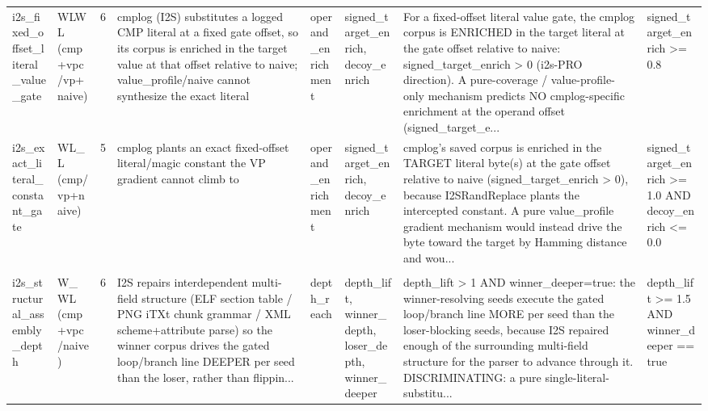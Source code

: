 \documentclass[7pt]{extarticle}
\begin{document}
{\begin{longtable}{@{}p{2.4cm}p{1.9cm}rp{4.3cm}p{1.5cm}p{1.7cm}p{4.6cm}p{3.0cm}@{}}
i2s\_\allowbreak fixed\_\allowbreak offset\_\allowbreak literal\_\allowbreak value\_\allowbreak gate & WLWL (cmp+vpc/vp+naive) & 6 & cmplog (I2S) substitutes a logged CMP literal at a fixed gate offset, so its corpus is enriched in the target value at that offset relative to naive; value\_\allowbreak profile/naive cannot synthesize the exact literal & operand\_\allowbreak enrichment & signed\_\allowbreak target\_\allowbreak enrich, decoy\_\allowbreak enrich & For a fixed-offset literal value gate, the cmplog corpus is ENRICHED in the target literal at the gate offset relative to naive: signed\_\allowbreak target\_\allowbreak enrich \textgreater{} 0 (i2s-PRO direction). A pure-coverage / value-profile-only mechanism predicts NO cmplog-specific enrichment at the operand offset (signed\_\allowbreak target\_\allowbreak e... & signed\_\allowbreak target\_\allowbreak enrich \textgreater{}= 0.8\\
i2s\_\allowbreak exact\_\allowbreak literal\_\allowbreak constant\_\allowbreak gate & WL\_\allowbreak L (cmp/vp+naive) & 5 & cmplog plants an exact fixed-offset literal/magic constant the VP gradient cannot climb to & operand\_\allowbreak enrichment & signed\_\allowbreak target\_\allowbreak enrich, decoy\_\allowbreak enrich & cmplog's saved corpus is enriched in the TARGET literal byte(s) at the gate offset relative to naive (signed\_\allowbreak target\_\allowbreak enrich \textgreater{} 0), because I2SRandReplace plants the intercepted constant. A pure value\_\allowbreak profile gradient mechanism would instead drive the byte toward the target by Hamming distance and wou... & signed\_\allowbreak target\_\allowbreak enrich \textgreater{}= 1.0 AND decoy\_\allowbreak enrich \textless{}= 0.0\\
\midrule
\rowcolor{black!10}\multicolumn{8}{@{}l}{\textbf{[I2S-pro]\ \ i2s\_\allowbreak structural\_\allowbreak assembly\_\allowbreak reach\_\allowbreak depth}\quad(final feature, n=8)}\\
i2s\_\allowbreak structural\_\allowbreak assembly\_\allowbreak depth & W\_\allowbreak WL (cmp+vpc/naive) & 6 & I2S repairs interdependent multi-field structure (ELF section table / PNG iTXt chunk grammar / XML scheme+attribute parse) so the winner corpus drives the gated loop/branch line DEEPER per seed than the loser, rather than flippin... & depth\_\allowbreak reach & depth\_\allowbreak lift, winner\_\allowbreak depth, loser\_\allowbreak depth, winner\_\allowbreak deeper & depth\_\allowbreak lift \textgreater{} 1 AND winner\_\allowbreak deeper=true: the winner-resolving seeds execute the gated loop/branch line MORE per seed than the loser-blocking seeds, because I2S repaired enough of the surrounding multi-field structure for the parser to advance through it. DISCRIMINATING: a pure single-literal-substitu... & depth\_\allowbreak lift \textgreater{}= 1.5 AND winner\_\allowbreak deeper == true\\

\end{longtable}}
\end{document}
